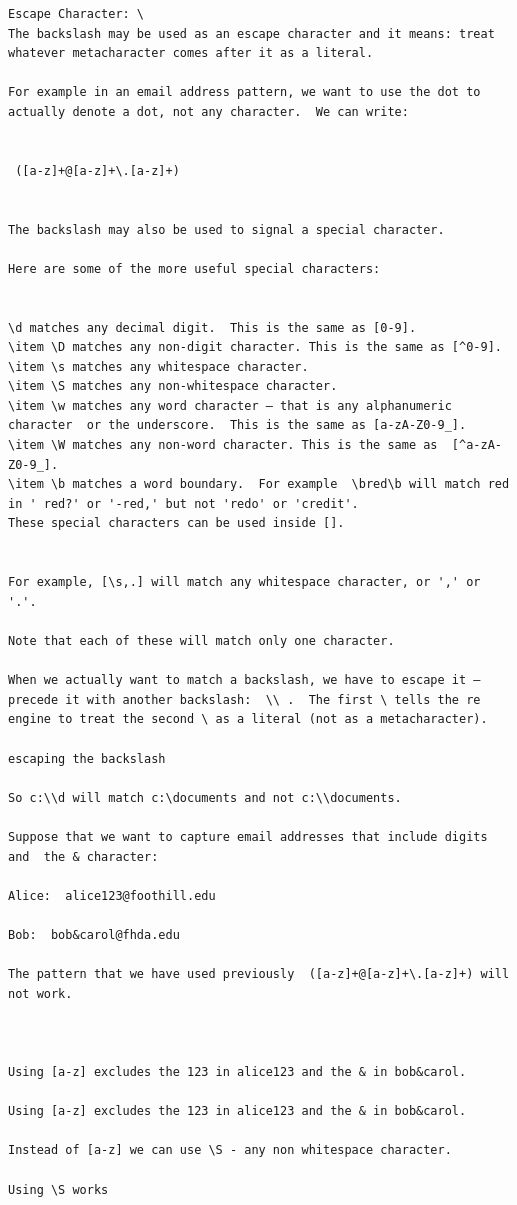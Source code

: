\documentclass{article}
\begin{document}
\begin{lstlisting}
Escape Character: \
The backslash may be used as an escape character and it means: treat whatever metacharacter comes after it as a literal.  

For example in an email address pattern, we want to use the dot to actually denote a dot, not any character.  We can write:


 ([a-z]+@[a-z]+\.[a-z]+)


The backslash may also be used to signal a special character.

Here are some of the more useful special characters:


\d matches any decimal digit.  This is the same as [0-9].
\item \D matches any non-digit character. This is the same as [^0-9].
\item \s matches any whitespace character.
\item \S matches any non-whitespace character.
\item \w matches any word character – that is any alphanumeric  character  or the underscore.  This is the same as [a-zA-Z0-9_].
\item \W matches any non-word character. This is the same as  [^a-zA-Z0-9_].
\item \b matches a word boundary.  For example  \bred\b will match red in ' red?' or '-red,' but not 'redo' or 'credit'. 
These special characters can be used inside []. 


For example, [\s,.] will match any whitespace character, or ',' or '.'.

Note that each of these will match only one character.

When we actually want to match a backslash, we have to escape it – precede it with another backslash:  \\ .  The first \ tells the re engine to treat the second \ as a literal (not as a metacharacter). 

escaping the backslash

So c:\\d will match c:\documents and not c:\\documents.

Suppose that we want to capture email addresses that include digits and  the & character:

Alice:  alice123@foothill.edu

Bob:  bob&carol@fhda.edu

The pattern that we have used previously  ([a-z]+@[a-z]+\.[a-z]+) will not work.

 

Using [a-z] excludes the 123 in alice123 and the & in bob&carol. 

Using [a-z] excludes the 123 in alice123 and the & in bob&carol. 

Instead of [a-z] we can use \S - any non whitespace character. 

Using \S works
\end{lstlisting}
\end{document}
